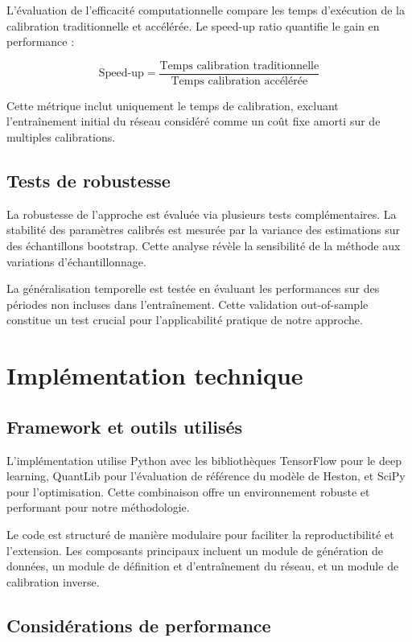 L'évaluation de l'efficacité computationnelle compare les temps d'exécution de la calibration traditionnelle et accélérée. Le speed-up ratio quantifie le gain en performance :

\begin{equation}
\text{Speed-up} = \frac{\text{Temps calibration traditionnelle}}{\text{Temps calibration accélérée}}
\end{equation}

Cette métrique inclut uniquement le temps de calibration, excluant l'entraînement initial du réseau considéré comme un coût fixe amorti sur de multiples calibrations.

\subsection{Tests de robustesse}

La robustesse de l'approche est évaluée via plusieurs tests complémentaires. La stabilité des paramètres calibrés est mesurée par la variance des estimations sur des échantillons bootstrap. Cette analyse révèle la sensibilité de la méthode aux variations d'échantillonnage.

La généralisation temporelle est testée en évaluant les performances sur des périodes non incluses dans l'entraînement. Cette validation out-of-sample constitue un test crucial pour l'applicabilité pratique de notre approche.

\section{Implémentation technique}

\subsection{Framework et outils utilisés}

L'implémentation utilise Python avec les bibliothèques TensorFlow pour le deep learning, QuantLib pour l'évaluation de référence du modèle de Heston, et SciPy pour l'optimisation. Cette combinaison offre un environnement robuste et performant pour notre méthodologie.

Le code est structuré de manière modulaire pour faciliter la reproductibilité et l'extension. Les composants principaux incluent un module de génération de données, un module de définition et d'entraînement du réseau, et un module de calibration inverse.

\subsection{Considérations de performance}


